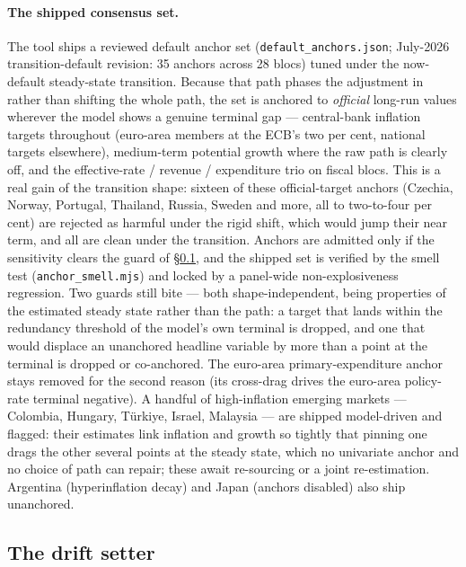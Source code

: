 \documentclass[11pt]{article}
\theoremstyle{plain}
\theoremstyle{remark}
\begin{document}
\paragraph{The shipped consensus set.} The tool ships a reviewed default anchor set
(\texttt{default\_anchors.json}; July-2026 transition-default revision: 35 anchors across 28 blocs)
tuned under the now-default steady-state transition. Because that path phases the adjustment in
rather than shifting the whole path, the set is anchored to \emph{official} long-run values wherever
the model shows a genuine terminal gap --- central-bank inflation targets throughout (euro-area
members at the ECB's two per cent, national targets elsewhere), medium-term potential growth where
the raw path is clearly off, and the effective-rate / revenue / expenditure trio on fiscal blocs.
This is a real gain of the transition shape: sixteen of these official-target anchors (Czechia,
Norway, Portugal, Thailand, Russia, Sweden and more, all to two-to-four per cent) are rejected as
harmful under the rigid shift, which would jump their near term, and all are clean under the
transition. Anchors are admitted only if the sensitivity clears the guard of \S\ref{sec:drift}, and
the shipped set is verified by the smell test (\texttt{anchor\_smell.mjs}) and locked by a
panel-wide non-explosiveness regression. Two guards still bite --- both shape-independent, being
properties of the estimated steady state rather than the path: a target that lands within the
redundancy threshold of the model's own terminal is dropped, and one that would displace an
unanchored headline variable by more than a point at the terminal is dropped or co-anchored. The
euro-area primary-expenditure anchor stays removed for the second reason (its cross-drag drives the
euro-area policy-rate terminal negative). A handful of high-inflation emerging markets --- Colombia,
Hungary, T\"urkiye, Israel, Malaysia --- are shipped model-driven and flagged: their estimates link
inflation and growth so tightly that pinning one drags the other several points at the steady state,
which no univariate anchor and no choice of path can repair; these await re-sourcing or a joint
re-estimation. Argentina (hyperinflation decay) and Japan (anchors disabled) also ship unanchored.

\subsection{The drift setter}\label{sec:drift}
\end{document}
